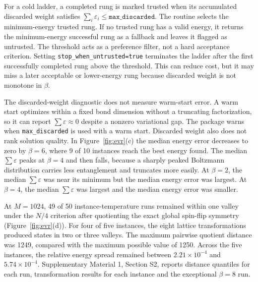 \documentclass[preprint,12pt,a4paper]{elsarticle}
\begin{document}
For a cold ladder, a completed rung is marked trusted when its accumulated
discarded weight satisfies $\sum_i\varepsilon_i \leq \texttt{max\_discarded}$.
The routine selects the minimum-energy trusted rung. If no trusted rung has a
valid energy, it returns the minimum-energy successful rung as a fallback and
leaves it flagged as untrusted. The threshold acts as a preference filter,
not a hard acceptance criterion. Setting \texttt{stop\_when\_untrusted=true}
terminates the ladder after the first successfully completed rung above the
threshold. This can reduce cost, but it may miss a later acceptable or
lower-energy rung because discarded weight is not monotone in $\beta$.

The discarded-weight diagnostic does not measure warm-start error. A warm start
optimizes within a fixed bond dimension without a truncating factorization, so
it can report $\sum\varepsilon\approx0$ despite a nonzero variational gap. The
package warns when \texttt{max\_discarded} is used with a warm start. Discarded
weight also does not rank solution quality. In
Figure~\ref{fig:evr}(c) the median energy error decreases to zero by $\beta=6$,
where 9 of 10 instances reach the best energy found. The median
$\sum\varepsilon$ peaks at $\beta=4$ and then falls, because a sharply peaked
Boltzmann distribution carries less entanglement and truncates more easily. At
$\beta=2$, the median $\sum\varepsilon$ was near its minimum but the median
energy error was largest. At $\beta=4$, the median $\sum\varepsilon$ was largest
and the median energy error was smaller.

At $M=1024$, 49 of 50 instance-temperature runs remained within one valley under
the $N/4$ criterion after quotienting the exact global spin-flip symmetry
(Figure~\ref{fig:evr}(d)). For four of five instances, the eight lattice
transformations produced states in two or three valleys. The maximum pairwise
quotient distance was 1249, compared with the maximum possible value of 1250.
Across the five instances, the relative energy spread remained between
$2.21\times10^{-4}$ and $5.74\times10^{-4}$.
Supplementary Material 1, Section S2, reports distance quantiles for each run,
transformation results for each instance and the exceptional $\beta=8$ run.
\end{document}
